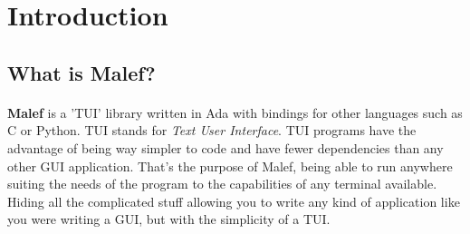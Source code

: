 
\section {Introduction}
   \subsection {What is Malef?}
   \paragraph{}
      \textbf {Malef} is a 'TUI' library written in Ada with bindings for other
   languages such as C or Python. TUI stands for \textit{Text User Interface}.
   TUI programs have the advantage of being way simpler to code and have fewer
   dependencies than any other GUI application. That's the purpose of Malef,
   being able to run anywhere suiting the needs of the program to the
   capabilities of any terminal available. Hiding all the complicated stuff
   allowing you to write any kind of application like you were writing a GUI,
   but with the simplicity of a TUI.

